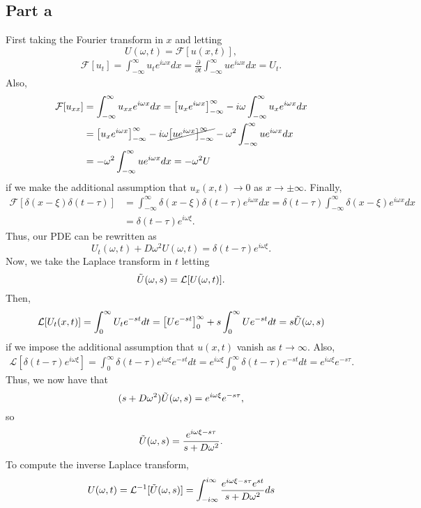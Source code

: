 \documentclass{article}
\begin{document}
\subsection{Part a}
First taking the Fourier transform in $x$ and letting 
\[
U(\omega,t)=\mathcal{F}[u(x,t)],
\]
\begin{align*}
	\mathcal{F}[u_{t}]=\int_{-\infty}^\infty u_{t}e^{i\omega x}dx=\frac{\partial}{\partial t}\int_{-\infty}^\infty ue^{i\omega x}dx=U_{t}.
\end{align*}
Also,
\begin{align*}
	\mathcal{F}[u_{xx}]&=\int_{-\infty}^\infty u_{xx}e^{i\omega x}dx=\left[u_xe^{i\omega x}\right]_{-\infty}^\infty-i\omega\int_{-\infty}^\infty u_{x}e^{i\omega x}dx\\&=\left[u_xe^{i\omega x}\right]_{-\infty}^\infty-i\omega\cancel{\left[ue^{i\omega x}\right]_{-\infty}^\infty}-\omega^2\int_{-\infty}^\infty ue^{i\omega x}dx\\&=
	-\omega^2\int_{-\infty}^\infty ue^{i\omega x}dx=-\omega^2U
\end{align*}
if we make the additional assumption that $u_x(x,t)\to0$ as $x\to\pm\infty$. Finally, 
\begin{align*}
\mathcal{F}[\delta(x-\xi)\delta(t-\tau)]&=\int_{-\infty}^\infty \delta(x-\xi)\delta(t-\tau)e^{i\omega x}dx=\delta(t-\tau)\int_{-\infty}^\infty \delta(x-\xi)e^{i\omega x}dx\\&=
\delta(t-\tau)e^{i\omega \xi}.
\end{align*}
Thus, our PDE can be rewritten as
\[
U_t(\omega,t)+D\omega^2U(\omega,t)=\delta(t-\tau)e^{i\omega \xi}.
\]
Now, we take the Laplace transform in $t$ letting \[
\Tilde{U}(\omega,s)=\mathcal{L}[U(\omega,t)].
\]
Then, 
\[
\mathcal{L}[U_t(x,t)]=\int_0^\infty U_te^{-st}dt=\left[Ue^{-st}\right]_0^\infty+s\int_0^\infty Ue^{-st}dt=s\Tilde{U}(\omega,s)
\]
if we impose the additional assumption that $u(x,t)$ vanish as $t\to\infty$. Also,
\begin{align*}
\mathcal{L}[\delta(t-\tau)e^{i\omega \xi}]=\int_0^\infty\delta(t-\tau)e^{i\omega \xi}e^{-st}dt=e^{i\omega\xi}\int_0^\infty\delta(t-\tau)e^{-st}dt=e^{i\omega\xi}e^{-s\tau}.
\end{align*}
Thus, we now have that
\[
(s+D\omega^2)\Tilde{U}(\omega,s)=e^{i\omega\xi}e^{-s\tau},
\]
so
\[
\Tilde{U}(\omega,s)=\frac{e^{i\omega\xi-s\tau}}{s+D\omega^2}.
\]
To compute the inverse Laplace transform,
\[
U(\omega,t)=\mathcal{L}^{-1}[\Tilde{U}(\omega,s)]=\int_{-i\infty}^{i\infty}\frac{e^{i\omega\xi-s\tau}e^{st}}{s+D\omega^2}ds%
\]
\end{document}
